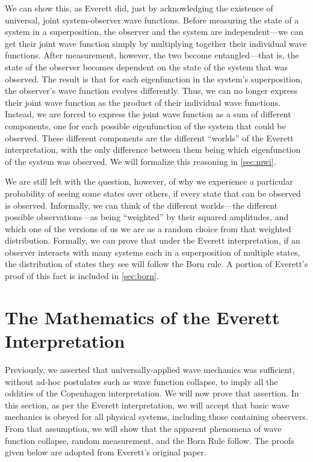 \documentclass[
    12pt,
    letterpaper,
    aps,
    prd,
    longbibliography,
    twocolumn,
    nofootinbib,
    raggedbottom,
    amsmath,
    amssymb,
    amsfonts,
]{revtex4-1}
\begin{document}
We can show this, as Everett did, just by acknowledging the existence of universal, joint system-observer wave functions.\cite{everett}\cite{relativestate} Before measuring the state of a system in a superposition, the observer and the system are independent---we can get their joint wave function simply by multiplying together their individual wave functions. After measurement, however, the two become entangled---that is, the state of the observer becomes dependent on the state of the system that was observed. The result is that for each eigenfunction in the system's superposition, the observer's wave function evolves differently. Thus, we can no longer express their joint wave function as the product of their individual wave functions. Instead, we are forced to express the joint wave function as a sum of different components, one for each possible eigenfunction of the system that could be observed. These different components are the different ``worlds'' of the Everett interpretation, with the only difference between them being which eigenfunction of the system was observed. We will formalize this reasoning in \autoref{sec:mwi}.

We are still left with the question, however, of why we experience a particular probability of seeing some states over others, if every state that can be observed is observed. Informally, we can think of the different worlds---the different possible observations---as being ``weighted'' by their squared amplitudes, and which one of the versions of us we are as a random choice from that weighted distribution. Formally, we can prove that under the Everett interpretation, if an observer interacts with many systems each in a superposition of multiple states, the distribution of states they see will follow the Born rule.\cite{everett}\cite{relativestate}\cite{bornproof1}\cite{bornproof2}\cite{bornproof3}\cite{bornproof2summary} A portion of Everett's proof of this fact is included in \autoref{sec:born}.

\section{The Mathematics of the Everett Interpretation}
\label{sec:math}

Previously, we asserted that universally-applied wave mechanics was sufficient, without ad-hoc postulates such as wave function collapse, to imply all the oddities of the Copenhagen interpretation. We will now prove that assertion. In this section, as per the Everett interpretation, we will accept that basic wave mechanics is obeyed for all physical systems, including those containing observers. From that assumption, we will show that the apparent phenomena of wave function collapse, random measurement, and the Born Rule follow. The proofs given below are adopted from Everett's original paper.\cite{everett}\cite{relativestate}
\end{document}
